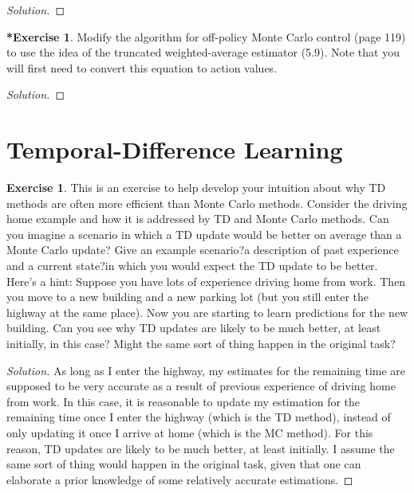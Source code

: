 \documentclass[oneside,11pt]{article}
\theoremstyle{definition}
\newtheorem{exer}[thm]{Exercise}
\newtheorem{exerstar}[thm]{*Exercise}
\newenvironment{solution}
{\renewcommand\qedsymbol{$\blacksquare$}\begin{proof}[Solution]} {\end{proof}}
\begin{document}
\begin{shaded}
\begin{solution} 


\end{solution} 
\end{shaded}


\begin{exerstar}
Modify the algorithm for off-policy Monte Carlo control (page 119) to use the idea of the truncated weighted-average estimator (5.9). Note that you will first need to convert this equation to action values.
\end{exerstar}


\begin{shaded}
\begin{solution} 


\end{solution} 
\end{shaded}


\section{Temporal-Difference Learning}

\begin{exer}
This is an exercise to help develop your intuition about why TD methods are often more efficient than Monte Carlo methods. Consider the driving home example and how it is addressed by TD and Monte Carlo methods. Can you imagine a scenario in which a TD update would be better on average than a Monte Carlo update? Give an example scenario?a description of past experience and a current state?in which you would expect the TD update to be better. Here's a hint: Suppose you have lots of experience driving home from work. Then you move to a new building and a new parking lot (but you still enter the highway at the same place). Now you are starting to learn predictions for the new building. Can you see why TD updates are likely to be much better, at least initially, in this case? Might the same sort of thing happen in the original task?
\end{exer}

\begin{shaded}
\begin{solution} 
As long as I enter the highway, my estimates for the remaining time are supposed to be very accurate as a result of previous experience of driving home from work. In this case, it is reasonable to update my estimation for the remaining time once I enter the highway (which is the TD method), instead of only updating it once I arrive at home (which is the MC method). For this reason, TD updates are likely to be much better, at least initially. I assume the same sort of thing would happen in the original task, given that one can elaborate a prior knowledge of some relatively accurate estimations.

\end{solution} 
\end{shaded}
\end{document}
